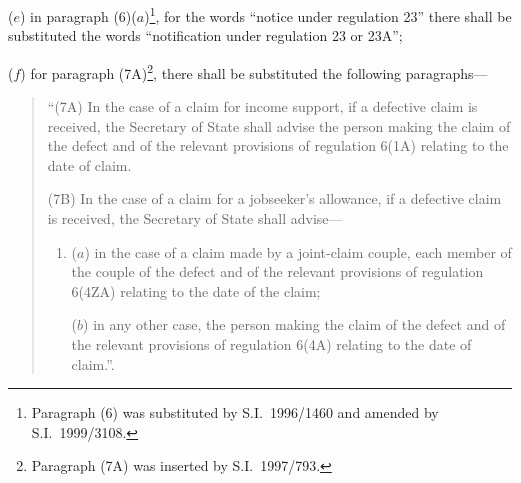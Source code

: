 \documentclass[12pt,a4paper]{article}
\begin{document}
\begin{enumerate}
($e$) in paragraph (6)($a$)\footnote{Paragraph (6) was substituted by S.I.\ 1996/1460 and amended by S.I.\ 1999/3108.}, for the words “notice under regulation 23” there shall be substituted the words “notification under regulation 23 or 23A”;

($f$) for paragraph (7A)\footnote{Paragraph (7A) was inserted by S.I.\ 1997/793.}, there shall be substituted the following paragraphs—
\begin{quotation}
“(7A) In the case of a claim for income support, if a defective claim is received, the Secretary of State shall advise the person making the claim of the defect and of the relevant provisions of regulation 6(1A) relating to the date of claim.

(7B) In the case of a claim for a jobseeker’s allowance, if a defective claim is received, the Secretary of State shall advise—
\begin{enumerate}\item[]
($a$) in the case of a claim made by a joint-claim couple, each member of the couple of the defect and of the relevant provisions of regulation 6(4ZA) relating to the date of the claim;

($b$) in any other case, the person making the claim of the defect and of the relevant provisions of regulation 6(4A) relating to the date of claim.”.
\end{enumerate}
\end{quotation}
\end{enumerate}
\end{document}
